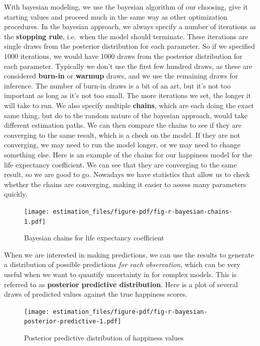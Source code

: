 \documentclass[
  letterpaper,
]{krantz}
\begin{document}
With bayesian modeling, we use the bayesian algorithm of our choosing,
give it starting values and proceed much in the same way as other
optimization procedures. In the bayesian approach, we always specify a
number of iterations as the \textbf{stopping rule}, i.e.~when the model
should terminate. These iterations are single draws from the posterior
distribution for each parameter. So if we specified 1000 iterations, we
would have 1000 draws from the posterior distribution for each
parameter. Typically we don't use the first few hundred draws, as these
are considered \textbf{burn-in} or \textbf{warmup} draws, and we use the
remaining draws for inference. The number of burn-in draws is a bit of
an art, but it's not too important as long as it's not too small. The
more iterations we set, the longer it will take to run. We also specify
multiple \textbf{chains}, which are each doing the exact same thing, but
do to the random nature of the bayesian approach, would take different
estimation paths. We can then compare the chains to see if they are
converging to the same result, which is a check on the model. If they
are not converging, we may need to run the model longer, or we may need
to change something else. Here is an example of the chains for our
happiness model for the life expectancy coefficient. We can see that
they are converging to the same result, so we are good to go. Nowadays
we have statistics that allow us to check whether the chains are
converging, making it easier to assess many parameters quickly.

\begin{figure}

{\centering \texttt{[image: estimation\_files/figure-pdf/fig-r-bayesian-chains-1.pdf]}

}

\caption{\label{fig-r-bayesian-chains}Bayesian chains for life
expectancy coefficient}

\end{figure}

When we are interested in making predictions, we can use the results to
generate a distribution of possible predictions \emph{for each
observation}, which can be very useful when we want to quantify
uncertainty in for complex models. This is referred to as
\textbf{posterior predictive distribution}. Here is a plot of several
draws of predicted values against the true happiness scores.

\begin{figure}

{\centering \texttt{[image: estimation\_files/figure-pdf/fig-r-bayesian-posterior-predictive-1.pdf]}

}

\caption{\label{fig-r-bayesian-posterior-predictive}Posterior predictive
distribution of happiness values}

\end{figure}
\end{document}
